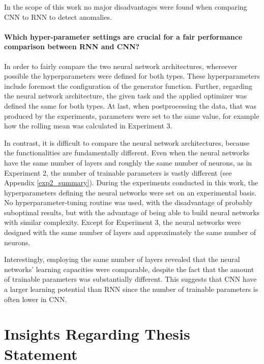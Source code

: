 In the scope of this work no major disadvantages were found when comparing CNN to RNN to detect anomalies.


\paragraph{Which hyper-parameter settings are crucial for a fair performance comparison between RNN and CNN?} In order to fairly compare the two neural network architectures, whereever possible the hyperparameters were defined for both types. These hyperparameters include foremost the configuration of the generator function. Further, regarding the neural network architecture, the given task and the applied optimizer was defined the same for both types. At last, when postprocessing the data, that was produced by the experiments, parameters were set to the same value, for example how the rolling mean was calculated in Experiment 3.

In contrast, it is difficult to compare the neural network architectures, because the functionalities are fundamentally different. Even when the neural networks have the same number of layers and roughly the same number of neurons, as in Experiment 2, the number of trainable parameters is vastly different (see Appendix \ref{exp2_summary}). During the experiments conducted in this work, the hyperparameters defining the neural networks were set on an experimental basis. No hyperparameter-tuning routine was used, with the disadvantage of probably suboptimal results, but with the advantage of being able to build neural networks with similar complexity. Except for Experiment 3, the neural networks were designed with the same number of layers and approximately the same number of neurons.

Interestingly, employing the same number of layers revealed that the neural networks' learning capacities were comparable, despite the fact that the amount of trainable parameters was substantially different. This suggests that CNN have a larger learning potential than RNN since the number of trainable parameters is often lower in CNN. 

\section{Insights Regarding Thesis Statement}

